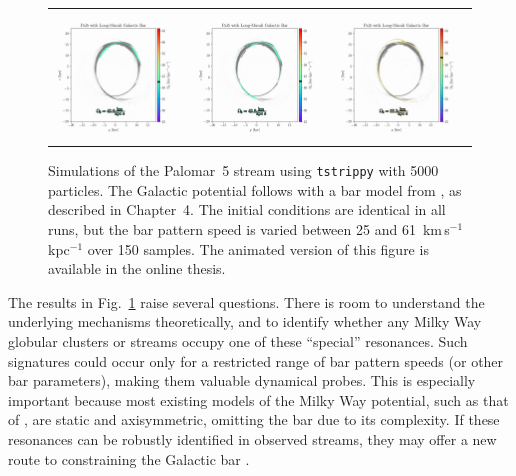\begin{figure}
\begin{tabular}{ccc}
                \includegraphics[width=.32\linewidth]{images/frame_0065.png}&
                \includegraphics[width=.32\linewidth]{images/frame_0066.png}&
                \includegraphics[width=.32\linewidth]{images/frame_0104.png}\\
            \end{tabular}
            \caption[The presence of a stellar bar with different rotational speeds affecting the Palomar~5 stream]{Simulations of the Palomar~5 stream using \texttt{tstrippy} with 5000 particles. The Galactic potential follows \citet{2017A&A...598A..66P} with a bar model from \citet{1997MNRAS.291..717M}, as described in Chapter~4. The initial conditions are identical in all runs, but the bar pattern speed is varied between 25 and 61~km\,s$^{-1}$\,kpc$^{-1}$ over 150 samples. The animated version of this figure is available in the online thesis. }
            \label{fig:pal5_with_bar}
        \end{figure}

        The results in Fig.~\ref{fig:pal5_with_bar} raise several questions. There is room to understand the underlying mechanisms theoretically, and to identify whether any Milky Way globular clusters or streams occupy one of these ``special'' resonances. Such signatures could occur only for a restricted range of bar pattern speeds (or other bar parameters), making them valuable dynamical probes. This is especially important because most existing models of the Milky Way potential, such as that of \citet{2024ApJ...967...89I}, are static and axisymmetric, omitting the bar due to its complexity. If these resonances can be robustly identified in observed streams, they may offer a new route to constraining the Galactic bar .

